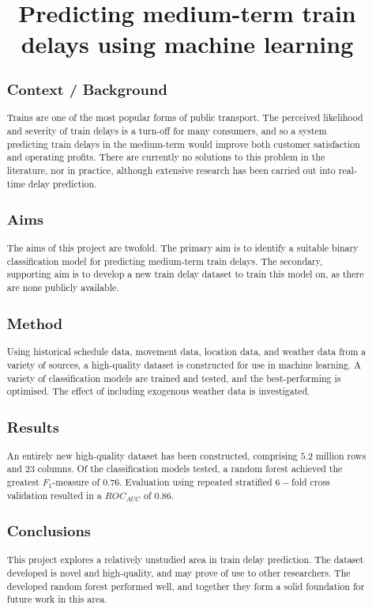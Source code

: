 \documentclass[12pt,a4paper]{article}
\title{Predicting medium-term train delays using machine learning}
\date{}
\begin{document}
\maketitle

\begin{abstract}

\subsection{Context / Background}

Trains are one of the most popular forms of public transport. The perceived likelihood and severity of train delays is a turn-off for many consumers, and so a system predicting train delays in the medium-term would improve both customer satisfaction and operating profits. There are currently no solutions to this problem in the literature, nor in practice, although extensive research has been carried out into real-time delay prediction.

\subsection{Aims}

The aims of this project are twofold. The primary aim is to identify a suitable binary classification model for predicting medium-term train delays. The secondary, supporting aim is to develop a new train delay dataset to train this model on, as there are none publicly available. 

\subsection{Method}

Using historical schedule data, movement data, location data, and weather data from a variety of sources, a high-quality dataset is constructed for use in machine learning. A variety of classification models are trained and tested, and the best-performing is optimised. The effect of including exogenous weather data is investigated.

\subsection{Results}

An entirely new high-quality dataset has been constructed, comprising $5.2$ million rows and $23$ columns. Of the classification models tested, a random forest achieved the greatest $F_1$-measure of $0.76$. Evaluation using repeated stratified $6-$fold cross validation resulted in a $ROC_{AUC}$ of $0.86$. 

\subsection{Conclusions}

This project explores a relatively unstudied area in train delay prediction. The dataset developed is novel and high-quality, and may prove of use to other researchers. The developed random forest performed well, and together they form a solid foundation for future work in this area.

\end{abstract}
\end{document}

